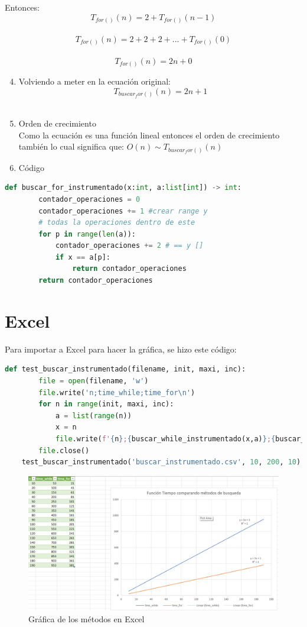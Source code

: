 \documentclass[stu, 12pt, letterpaper, donotrepeattitle, floatsintext, natbib, helv]{apa7}
\begin{document}
Entonces: \[T_{for()}(n) = 2 + T_{for()}(n-1)\] \\
\[T_{for()}(n) = 2 + 2 + 2 + ... + T_{for()}(0)\] \\
\[T_{for()}(n) = 2n + 0\]

\begin{enumerate}
    \setcounter{enumi}{3}
    \item Volviendo a meter en la ecuación original:
\[T_{buscar_for()}(n) = 2n + 1\] \\
    \item Orden de crecimiento \\
Como la ecuación es una función lineal entonces el orden de crecimiento también lo cual significa que: $O(n) \sim T_{buscar_for()}(n)$
    \item Código
\end{enumerate}
\begin{lstlisting}[language=Python]
    def buscar_for_instrumentado(x:int, a:list[int]) -> int:
        contador_operaciones = 0
        contador_operaciones += 1 #crear range y 
        # todas la operaciones dentro de este
        for p in range(len(a)):
            contador_operaciones += 2 # == y []
            if x == a[p]:
                return contador_operaciones
        return contador_operaciones
\end{lstlisting}

\section{Excel}
Para importar a Excel para hacer la gráfica, se hizo este código:
{\scriptsize
\begin{lstlisting}[language=Python]
    def test_buscar_instrumentado(filename, init, maxi, inc):
        file = open(filename, 'w')
        file.write('n;time_while;time_for\n')
        for n in range(init, maxi, inc):
            a = list(range(n))
            x = n
            file.write(f'{n};{buscar_while_instrumentado(x,a)};{buscar_for_instrumentado(x,a)}\n')
        file.close()
    test_buscar_instrumentado('buscar_instrumentado.csv', 10, 200, 10)
\end{lstlisting}}

\begin{figure}[h]
    \centering
    \includegraphics[width=1.2\textwidth]{CroppedExcelGraph.png}
    \caption{Gráfica de los métodos en Excel}
    \label{fig:figureExcel1}
\end{figure}
\nocite{Clase21Mar}
\newpage
\renewcommand\refname{\large\textbf{Referencias}}

\end{document}
